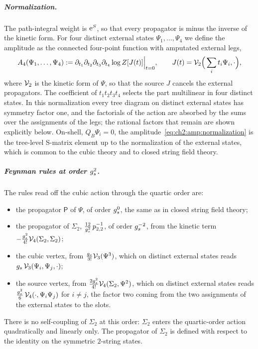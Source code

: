 \subparagraph{Normalization.}
The path-integral weight is $\mathrm{e}^{S}$, so that every propagator is minus the inverse of the kinetic form.
For four distinct external states $\Psi_1, \ldots, \Psi_4$ we define the amplitude as the connected four-point function with amputated external legs,
\begin{equation}
  \label{eq:ch2:amp:normalization}
  A_4(\Psi_1, \ldots, \Psi_4)
    := \partial_{t_1} \partial_{t_2} \partial_{t_3} \partial_{t_4} \log Z[J(t)] \Big|_{t = 0},
  \qquad
  J(t)
    = \mathcal{V}_{2} \Big( \sum_i t_i \Psi_i, \cdot \Big),
\end{equation}
where $\mathcal{V}_{2}$ is the kinetic form of $\Psi$, so that the source $J$ cancels the external propagators.
The coefficient of $t_1 t_2 t_3 t_4$ selects the part multilinear in four distinct states.
In this normalization every tree diagram on distinct external states has symmetry factor one, and the factorials of the action are absorbed by the sums over the assignments of the legs; the rational factors that remain are shown explicitly below.
On-shell, $Q_B \Psi_i = 0$, the amplitude~\eqref{eq:ch2:amp:normalization} is the tree-level S-matrix element up to the normalization of the external states, which is common to the cubic theory and to closed string field theory.

\subparagraph{Feynman rules at order $g_s^2$.}
The rules read off the cubic action through the quartic order are:
\begin{itemize}
  \item the propagator $\mathsf P$ of $\Psi$, of order $g_s^0$, the same as in closed string field theory;
  \item the propagator of $\Sigma_2$, $\tfrac{12}{g_s^2} \, p_{2,2}^{-1}$, of order $g_s^{-2}$, from the kinetic term $- \tfrac{g_s^2}{4!} \mathcal{V}_{4}(\Sigma_2, \Sigma_2)$;
  \item the cubic vertex, from $\tfrac{g_s}{3!} \mathcal{V}_{3}(\Psi^3)$, which on distinct external states reads $g_s \, \mathcal{V}_{3}(\Psi_i, \Psi_j, \cdot)$;
  \item the source vertex, from $\tfrac{2 g_s^2}{4!} \mathcal{V}_{4}(\Sigma_2, \Psi^2)$, which on distinct external states reads $\tfrac{g_s^2}{6} \, \mathcal{V}_{4}(\cdot, \Psi_i \Psi_j)$ for $i \ne j$, the factor two coming from the two assignments of the external states to the slots.
\end{itemize}
There is no self-coupling of $\Sigma_2$ at this order: $\Sigma_2$ enters the quartic-order action quadratically and linearly only.
The propagator of $\Sigma_2$ is defined with respect to the identity on the symmetric $2$-string states.

